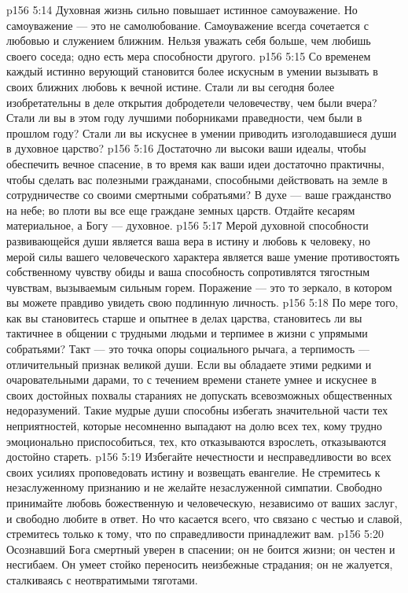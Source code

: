 \vs p156 5:14 Духовная жизнь сильно повышает истинное самоуважение. Но самоуважение --- это не самолюбование. Самоуважение всегда сочетается с любовью и служением ближним. Нельзя уважать себя больше, чем любишь своего соседа; одно есть мера способности другого.
\vs p156 5:15 Со временем каждый истинно верующий становится более искусным в умении вызывать в своих ближних любовь к вечной истине. Стали ли вы сегодня более изобретательны в деле открытия добродетели человечеству, чем были вчера? Стали ли вы в этом году лучшими поборниками праведности, чем были в прошлом году? Стали ли вы искуснее в умении приводить изголодавшиеся души в духовное царство?
\vs p156 5:16 Достаточно ли высоки ваши идеалы, чтобы обеспечить вечное спасение, в то время как ваши идеи достаточно практичны, чтобы сделать вас полезными гражданами, способными действовать на земле в сотрудничестве со своими смертными собратьями? В духе --- ваше гражданство на небе; во плоти вы все еще граждане земных царств. Отдайте кесарям материальное, а Богу --- духовное.
\vs p156 5:17 Мерой духовной способности развивающейся души является ваша вера в истину и любовь к человеку, но мерой силы вашего человеческого характера является ваше умение противостоять собственному чувству обиды и ваша способность сопротивлятся тягостным чувствам, вызываемым сильным горем. Поражение --- это то зеркало, в котором вы можете правдиво увидеть свою подлинную личность.
\vs p156 5:18 По мере того, как вы становитесь старше и опытнее в делах царства, становитесь ли вы тактичнее в общении с трудными людьми и терпимее в жизни с упрямыми собратьями? Такт --- это точка опоры социального рычага, а терпимость --- отличительный признак великой души. Если вы обладаете этими редкими и очаровательными дарами, то с течением времени станете умнее и искуснее в своих достойных похвалы стараниях не допускать всевозможных общественных недоразумений. Такие мудрые души способны избегать значительной части тех неприятностей, которые несомненно выпадают на долю всех тех, кому трудно эмоционально приспособиться, тех, кто отказываются взрослеть, отказываются достойно стареть.
\vs p156 5:19 Избегайте нечестности и несправедливости во всех своих усилиях проповедовать истину и возвещать евангелие. Не стремитесь к незаслуженному признанию и не желайте незаслуженной симпатии. Свободно принимайте любовь божественную и человеческую, независимо от ваших заслуг, и свободно любите в ответ. Но что касается всего, что связано с честью и славой, стремитесь только к тому, что по справедливости принадлежит вам.
\vs p156 5:20 Осознавший Бога смертный уверен в спасении; он не боится жизни; он честен и несгибаем. Он умеет стойко переносить неизбежные страдания; он не жалуется, сталкиваясь с неотвратимыми тяготами.
